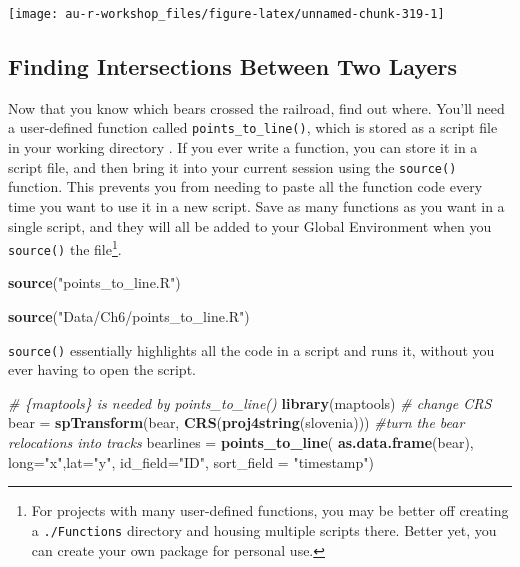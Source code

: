 \documentclass[]{book}
\newenvironment{Shaded}{\begin{snugshade}}{\end{snugshade}}
\newcommand{\CommentTok}[1]{\textcolor[rgb]{0.56,0.35,0.01}{\textit{#1}}}
\newcommand{\DataTypeTok}[1]{\textcolor[rgb]{0.13,0.29,0.53}{#1}}
\newcommand{\KeywordTok}[1]{\textcolor[rgb]{0.13,0.29,0.53}{\textbf{#1}}}
\newcommand{\NormalTok}[1]{#1}
\newcommand{\StringTok}[1]{\textcolor[rgb]{0.31,0.60,0.02}{#1}}
\let\rmarkdownfootnote\footnote%
\def\footnote{\protect\rmarkdownfootnote}
\begin{document}
\begin{center}\texttt{[image: au-r-workshop\_files/figure-latex/unnamed-chunk-319-1]} \end{center}

\hypertarget{finding-intersections-between-two-layers}{%
\subsection{Finding Intersections Between Two Layers}\label{finding-intersections-between-two-layers}}

Now that you know which bears crossed the railroad, find out where. You'll need a user-defined function called \texttt{points\_to\_line()}, which is stored as a script file in your working directory \citep{points-line-cite}. If you ever write a function, you can store it in a script file, and then bring it into your current session using the \texttt{source()} function. This prevents you from needing to paste all the function code every time you want to use it in a new script. Save as many functions as you want in a single script, and they will all be added to your Global Environment when you \texttt{source()} the file\footnote{For projects with many user-defined functions, you may be better off creating a \texttt{./Functions} directory and housing multiple scripts there. Better yet, you can create your own package for personal use.}.

\begin{Shaded}
\begin{Highlighting}[]
\KeywordTok{source}\NormalTok{(}\StringTok{"points_to_line.R"}\NormalTok{)}
\end{Highlighting}
\end{Shaded}

\begin{Shaded}
\begin{Highlighting}[]
\KeywordTok{source}\NormalTok{(}\StringTok{"Data/Ch6/points_to_line.R"}\NormalTok{)}
\end{Highlighting}
\end{Shaded}

\texttt{source()} essentially highlights all the code in a script and runs it, without you ever having to open the script.

\begin{Shaded}
\begin{Highlighting}[]
\CommentTok{# \{maptools\} is needed by points_to_line()}
\KeywordTok{library}\NormalTok{(maptools) }
\CommentTok{# change CRS}
\NormalTok{bear =}\StringTok{ }\KeywordTok{spTransform}\NormalTok{(bear, }\KeywordTok{CRS}\NormalTok{(}\KeywordTok{proj4string}\NormalTok{(slovenia)))}
\CommentTok{#turn the bear relocations into tracks}
\NormalTok{bearlines =}\StringTok{ }\KeywordTok{points_to_line}\NormalTok{(}
  \KeywordTok{as.data.frame}\NormalTok{(bear),}
  \DataTypeTok{long=}\StringTok{"x"}\NormalTok{,}\DataTypeTok{lat=}\StringTok{"y"}\NormalTok{,}
  \DataTypeTok{id_field=}\StringTok{"ID"}\NormalTok{, }\DataTypeTok{sort_field =} \StringTok{"timestamp"}\NormalTok{)}
\end{Highlighting}
\end{Shaded}
\end{document}
